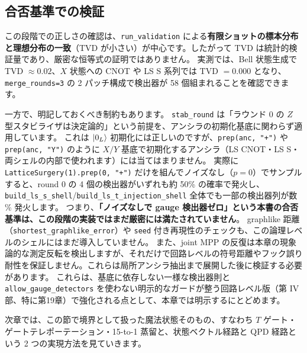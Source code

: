 \subsection*{合否基準での検証}

この段階での正しさの確認は、\texttt{run\_validation} による\textbf{有限ショットの標本分布と理想分布の一致}（TVD が小さい）が中心です。したがって TVD は統計的検証量であり、厳密な恒等式の証明ではありません。
実測では、Bell 状態生成で TVD $\approx 0.02$、$X$ 状態への CNOT や LS S 系列では TVD $=0.000$ となり、\texttt{merge\_rounds=3} の 2 パッチ構成で検出器が 58 個組まれることを確認できます。

一方で、明記しておくべき制約もあります。
\texttt{stab\_round} は「ラウンド 0 の $Z$ 型スタビライザは決定論的」という前提を、アンシラの初期化基底に関わらず適用しています。
これは $\ket{0_L}$ 初期化には正しいのですが、\texttt{prep(anc, "+")} や \texttt{prep(anc, "Y")} のように $X/Y$ 基底で初期化するアンシラ（LS CNOT・LS S・両シェルの内部で使われます）には当てはまりません。
実際に \texttt{LatticeSurgery(1).prep(0, "+")} だけを組んでノイズなし（$p=0$）でサンプルすると、round 0 の 4 個の検出器がいずれも約 50\% の確率で発火し、\texttt{build\_ls\_s\_shell}/\texttt{build\_ls\_t\_injection\_shell} 全体でも一部の検出器列が数 \% 発火します。
つまり、\textbf{「ノイズなしで gauge 検出器ゼロ」という本書の合否基準は、この段階の実装ではまだ厳密には満たされていません}。
graphlike 距離（\texttt{shortest\_graphlike\_error}）や \texttt{seed} 付き再現性のチェックも、この論理レベルのシェルにはまだ導入していません。
また、joint MPP の反復は本章の現象論的な測定反転を検出しますが、それだけで回路レベルの符号距離やフック誤り耐性を保証しません。これらは局所アンシラ抽出まで展開した後に検証する必要があります\cite{horsman2012lattice,fowler2012surface}。
これらは、基底に依存しない一様な検出器則と \texttt{allow\_gauge\_detectors} を使わない明示的なガードが整う回路レベル版（第 IV 部、特に第19章）で強化される点として、本章では明示するにとどめます。

次章では、この節で境界として扱った魔法状態そのもの、すなわち $T$ ゲート・ゲートテレポーテーション・15-to-1 蒸留と、状態ベクトル経路と QPD 経路という 2 つの実現方法を見ていきます。

